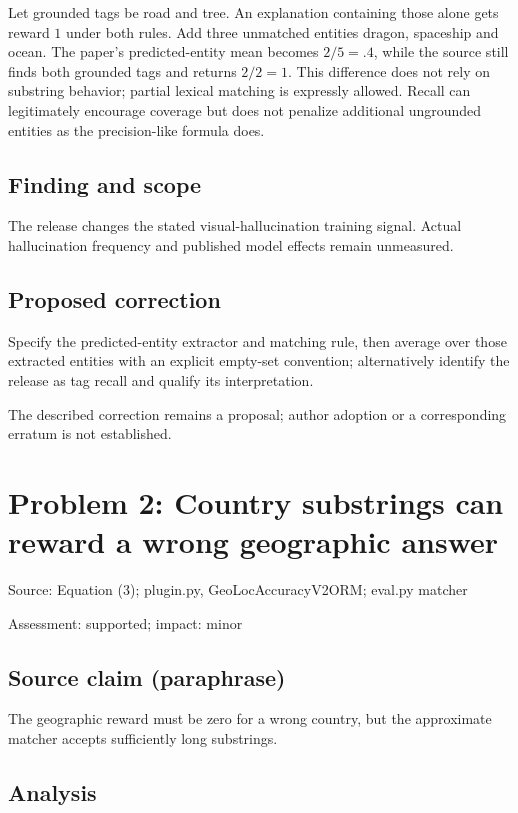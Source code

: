 \documentclass[11pt]{article}
\begin{document}
Let grounded tags be road and tree. An explanation containing those alone gets reward \(1\) under both rules. Add three unmatched entities dragon, spaceship and ocean. The paper’s predicted-entity mean becomes \(2/5=.4\), while the source still finds both grounded tags and returns \(2/2=1\). This difference does not rely on substring behavior; partial lexical matching is expressly allowed. Recall can legitimately encourage coverage but does not penalize additional ungrounded entities as the precision-like formula does.

\subsection*{Finding and scope}

The release changes the stated visual-hallucination training signal. Actual hallucination frequency and published model effects remain unmeasured.

\subsection*{Proposed correction}

Specify the predicted-entity extractor and matching rule, then average over those extracted entities with an explicit empty-set convention; alternatively identify the release as tag recall and qualify its interpretation.

The described correction remains a proposal; author adoption or a corresponding erratum is not established.

\section*{Problem 2: Country substrings can reward a wrong geographic answer}

Source: Equation (3); plugin.py, GeoLocAccuracyV2ORM; eval.py matcher

Assessment: supported; impact: minor

\subsection*{Source claim (paraphrase)}

The geographic reward must be zero for a wrong country, but the approximate matcher accepts sufficiently long substrings.

\subsection*{Analysis}
\end{document}
